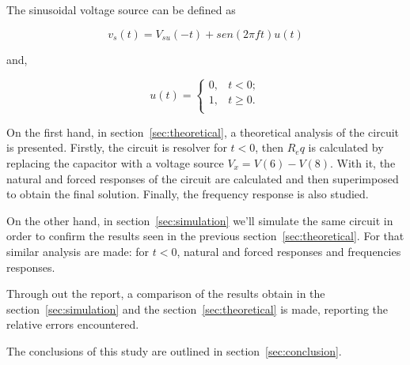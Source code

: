 \par The sinusoidal voltage source can be defined as 

\begin{equation}
  v_s(t) = V_{su}(-t) + sen(2\pi ft)u(t) 
  \label{eq:vs}
\end{equation}

and,

\begin{equation}
u(t)= \begin{cases} 
	     0, & t<0; \\ 
	     1, & t \geq 0. \\
      \end{cases}
      \label{eq:teo}
\end{equation}

\par On the first hand, in section~\ref{sec:theoretical}, a theoretical analysis of the circuit is
presented. Firstly, the circuit is resolver for $t<0$, then $R_eq$ is calculated by replacing the capacitor with a voltage source $V_x=V(6)-V(8)$. With it, the natural and forced responses of the circuit are calculated and then superimposed to obtain the final solution. Finally, the frequency response is also studied.

\par On the other hand, in section~\ref{sec:simulation} we'll simulate the same circuit in order to confirm the results seen in the previous section~\ref{sec:theoretical}. For that similar analysis are made: for $t<0$, natural and forced responses and frequencies responses.

\par Through out the report, a comparison of the results obtain in the section~\ref{sec:simulation} and the section~\ref{sec:theoretical} is made, reporting the relative errors encountered. 

\par  The conclusions of this study are outlined in section~\ref{sec:conclusion}.

\newpage
